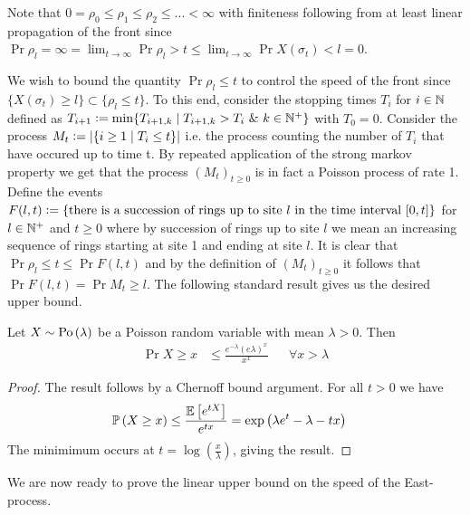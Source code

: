 Note that $0 = \rho_0 \leq \rho_1 \leq \rho_2 \leq ... < \infty$ with finiteness following from at least linear propagation of the front since $\Pr{\rho_l = \infty} = \lim_{t \rightarrow \infty} \Pr{\rho_l > t} \leq \lim_{t \rightarrow \infty} \Pr{X\left( \sigma_t\right) < l} = 0$.

We wish to bound the quantity $\Pr{\rho_l \leq t}$ to control the speed of the front since  $\{X \left( \sigma_t \right) \geq l \} \subset \{\rho_l \leq t \}$. To this end, consider the stopping times $T_i$ for $i \in \mathbb{N}$ defined as $T_{i+1} \vcentcolon= \min\{ T_{i+1, k} \mid T_{i+1, k} > T_i\ \&\ k \in \mathbb{N}^+ \}$ with $T_0 = 0$. Consider the process $M_t \vcentcolon= |\{i \geq 1 \mid T_i \leq t \}|$ i.e. the process counting the number of $T_i$ that have occured up to time t. By repeated application of the strong markov property we get that the process $(M_t)_{t \geq 0}$ is in fact a Poisson process of rate 1. \\

Define the events $F(l, t) \vcentcolon= \{ \text{there is a succession of rings up to site $l$ in the time interval $[0,t]$} \}$ for $l \in \mathbb{N}^+$ and $t \geq 0$ where by succession of rings up to site $l$ we mean an increasing sequence of rings starting at site 1 and ending at site $l$. It is clear that $\Pr{\rho_l \leq t} \leq \Pr{F(l, t)}$ and by the definition of $(M_t)_{t \geq 0}$ it follows that $\Pr{F(l, t)} = \Pr{M_t \geq l}$. The following standard result gives us the desired upper bound. 

\begin{lemma}\label{lem:chernoff}
Let $X \sim \text{Po} \left( \lambda \right)$ be a Poisson random variable with mean $\lambda > 0$. Then 
\begin{align}
\Pr{X \geq x} &\leq \frac{e^{-\lambda}(e \lambda)^x}{x^x} &&\forall x > \lambda
\end{align} 
\end{lemma}

\begin{proof}
The result follows by a Chernoff bound argument. For all $t > 0$ we have
\begin{align*}
\mathbb{P} \left( X \geq x \right) &\leq \frac{\mathbb{E}\left[ e^{tX} \right]}{e^{tx}} = \exp\left( \lambda e^t - \lambda - tx \right)
\end{align*} 
The minimimum occurs at $t = \log\left( \frac{x}{\lambda} \right)$, giving the result. 
\end{proof}

We are now ready to prove the linear upper bound on the speed of the East-process.

